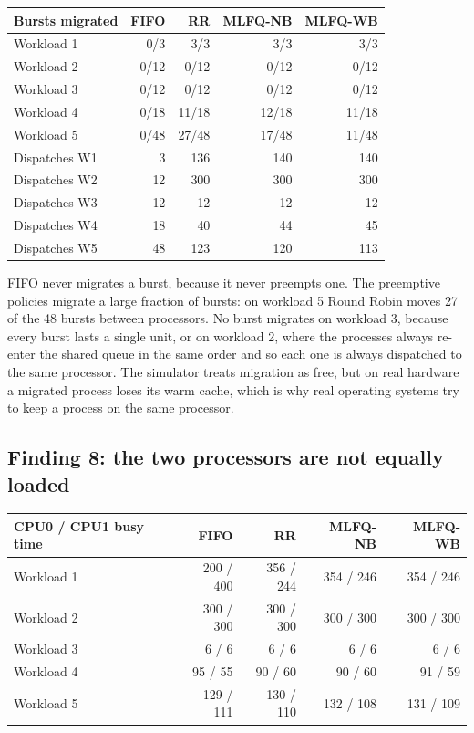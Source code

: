 \documentclass[11pt,a4paper]{article}
\begin{document}
\begin{center}\small
\begin{tabular}{lrrrr}
\toprule
\textbf{Bursts migrated} & \textbf{FIFO} & \textbf{RR} & \textbf{MLFQ-NB} & \textbf{MLFQ-WB}\\
\midrule
Workload 1 & 0/3 & 3/3 & 3/3 & 3/3 \\
Workload 2 & 0/12 & 0/12 & 0/12 & 0/12 \\
Workload 3 & 0/12 & 0/12 & 0/12 & 0/12 \\
Workload 4 & 0/18 & 11/18 & 12/18 & 11/18 \\
Workload 5 & 0/48 & 27/48 & 17/48 & 11/48 \\
\midrule
Dispatches W1 & 3 & 136 & 140 & 140 \\
Dispatches W2 & 12 & 300 & 300 & 300 \\
Dispatches W3 & 12 & 12 & 12 & 12 \\
Dispatches W4 & 18 & 40 & 44 & 45 \\
Dispatches W5 & 48 & 123 & 120 & 113 \\
\bottomrule\end{tabular}\end{center}

FIFO never migrates a burst, because it never preempts one. The preemptive policies migrate a
large fraction of bursts: on workload 5 Round Robin moves 27 of the 48 bursts between
processors. No burst migrates on workload 3, because every burst lasts a single unit, or on
workload 2, where the processes always re-enter the shared queue in the same order and so
each one is always dispatched to the same processor. The simulator treats
migration as free, but on real hardware a migrated process loses its warm cache, which is why
real operating systems try to keep a process on the same processor.

\subsection{Finding 8: the two processors are not equally loaded}

\begin{center}\small
\begin{tabular}{lrrrr}
\toprule
\textbf{CPU0 / CPU1 busy time} & \textbf{FIFO} & \textbf{RR} & \textbf{MLFQ-NB} & \textbf{MLFQ-WB}\\
\midrule
Workload 1 & 200 / 400 & 356 / 244 & 354 / 246 & 354 / 246 \\
Workload 2 & 300 / 300 & 300 / 300 & 300 / 300 & 300 / 300 \\
Workload 3 & 6 / 6 & 6 / 6 & 6 / 6 & 6 / 6 \\
Workload 4 & 95 / 55 & 90 / 60 & 90 / 60 & 91 / 59 \\
Workload 5 & 129 / 111 & 130 / 110 & 132 / 108 & 131 / 109 \\
\bottomrule\end{tabular}\end{center}
\end{document}
